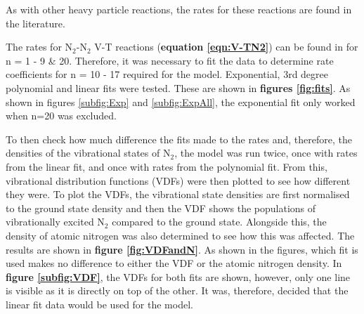 \documentclass[11pt, oneside]{article}   	%
\begin{document}
As with other heavy particle reactions, the rates for these reactions are found in the literature.


The rates for N$_2$-N$_2$ V-T reactions (\textbf{equation \ref{eqn:V-TN2}}) can be found in  \cite{Billing1979vv} for n = 1 - 9 \& 20.
Therefore, it was necessary to fit the data to determine rate coefficients for n = 10 - 17 required for the model.
Exponential, 3rd degree polynomial and linear fits were tested.
These are shown in \textbf{figures \ref{fig:fits}}.
As shown in figures \ref{subfig:Exp} and \ref{subfig:ExpAll}, the exponential fit only worked when n=20 was excluded.

To then check how much difference the fits made to the rates and, therefore, the densities of the vibrational states of N$_2$, the model was run twice, once with rates from the linear fit, and once with rates from the polynomial fit.
From this, vibrational distribution functions (VDFs) were then plotted to see how different they were.
To plot the VDFs, the vibrational state densities are first normalised to the ground state density and then the VDF shows the populations of vibrationally excited N$_2$ compared to the ground state.
Alongside this, the density of atomic nitrogen was also determined to see how this was affected.
The results are shown in \textbf{figure \ref{fig:VDFandN}}.
As shown in the figures, which fit is used makes no difference to either the VDF or the atomic nitrogen density.
In \textbf{figure \ref{subfig:VDF}}, the VDFs for both fits are shown, however, only one line is visible as it is directly on top of the other.
It was, therefore, decided that the linear fit data would be used for the model.



\end{document}
